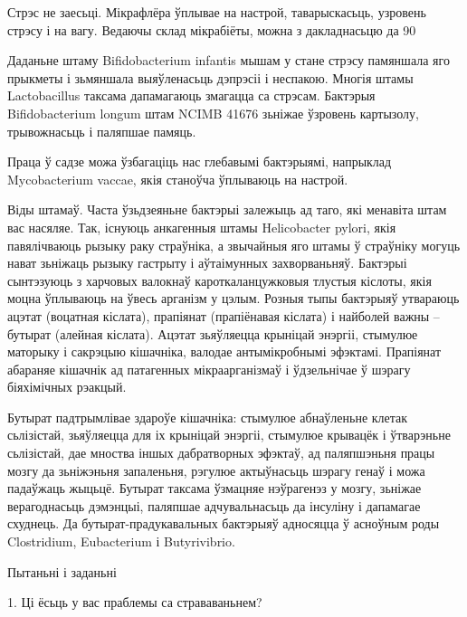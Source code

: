 Стрэс не заесьці. Мікрафлёра ўплывае на настрой, таварыскасьць, узровень стрэсу і на вагу. Ведаючы склад мікрабіёты, можна з дакладнасьцю да 90%

Даданьне штаму Bifidobacterium infantis мышам у стане стрэсу памяншала яго прыкметы і зьмяншала выяўленасьць дэпрэсіі і неспакою. Многія штамы Lactobacillus таксама дапамагаюць змагацца са стрэсам. Бактэрыя Bifidobacterium longum штам NCIMB 41676 зьніжае ўзровень картызолу, трывожнасьць і паляпшае памяць.

Праца ў садзе можа ўзбагаціць нас глебавымі бактэрыямі, напрыклад Mycobacterium vaccae, якія станоўча ўплываюць на настрой.

Віды штамаў. Часта ўзьдзеяньне бактэрыі залежыць ад таго, які менавіта штам вас насяляе. Так, існуюць анкагенныя штамы Helicobacter pylori, якія павялічваюць рызыку раку страўніка, а звычайныя яго штамы ў страўніку могуць нават зьніжаць рызыку гастрыту і аўтаімунных захворваньняў. Бактэрыі сынтэзуюць з харчовых валокнаў кароткаланцужковыя тлустыя кіслоты, якія моцна ўплываюць на ўвесь арганізм у цэлым. Розныя тыпы бактэрыяў утвараюць ацэтат (воцатная кіслата), прапіянат (прапіёнавая кіслата) і найболей важны – бутырат (алейная кіслата). Ацэтат зьяўляецца крыніцай энэргіі, стымулюе маторыку і сакрэцыю кішачніка, валодае антымікробнымі эфэктамі. Прапіянат абараняе кішачнік ад патагенных мікраарганізмаў і ўдзельнічае ў шэрагу біяхімічных рэакцый.

Бутырат падтрымлівае здароўе кішачніка: стымулюе абнаўленьне клетак сьлізістай, зьяўляецца для іх крыніцай энэргіі, стымулюе крывацёк і ўтварэньне сьлізістай, дае мноства іншых дабратворных эфэктаў, ад паляпшэньня працы мозгу да зьніжэньня запаленьня, рэгулюе актыўнасьць шэрагу генаў і можа падаўжаць жыцьцё. Бутырат таксама ўзмацняе нэўрагенэз у мозгу, зьніжае верагоднасьць дэмэнцыі, паляпшае адчувальнасьць да інсуліну і дапамагае схуднець. Да бутырат-прадукавальных бактэрыяў адносяцца ў асноўным роды Clostridium, Eubacterium і Butyrivibrio.

Пытаньні і заданьні

1. Ці ёсьць у вас праблемы са страваваньнем?

